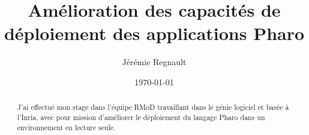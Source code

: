 \documentclass[12pt,a4paper]{article}
\title{Amélioration des capacités de déploiement des applications Pharo}
\author{Jérémie Regnault}
\date{\today}
\begin{document}
	\maketitle
	\newpage
	\begin{abstract}
		J'ai effectué mon stage dans l'équipe RMoD travaillant dans le génie logiciel et basée à l'Inria, avec pour mission d'améliorer le déploiement du langage Pharo dans un environnement en lecture seule. 
	\end{abstract}
	\newpage
	
	\newpage
	
\end{document}
